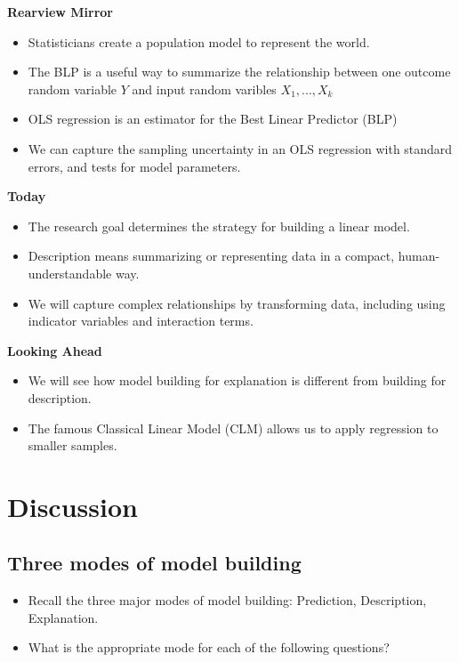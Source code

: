 \documentclass[
]{book}
\providecommand{\tightlist}{%
  \setlength{\itemsep}{0pt}\setlength{\parskip}{0pt}}
\theoremstyle{definition}
\theoremstyle{definition}
\theoremstyle{definition}
\theoremstyle{definition}
\theoremstyle{remark}
\begin{document}
\textbf{Rearview Mirror}

\begin{itemize}
\item
  Statisticians create a population model to represent the world.
\item
  The BLP is a useful way to summarize the relationship between one outcome random variable \(Y\) and input random varibles \(X_1,...,X_k\)
\item
  OLS regression is an estimator for the Best Linear Predictor (BLP)
\item
  We can capture the sampling uncertainty in an OLS regression with standard errors, and tests for model parameters.
\end{itemize}

\textbf{Today}

\begin{itemize}
\item
  The research goal determines the strategy for building a linear model.
\item
  Description means summarizing or representing data in a compact, human-understandable way.
\item
  We will capture complex relationships by transforming data, including using indicator variables and interaction terms.
\end{itemize}

\textbf{Looking Ahead}

\begin{itemize}
\item
  We will see how model building for explanation is different from building for description.
\item
  The famous Classical Linear Model (CLM) allows us to apply regression to smaller samples.
\end{itemize}

\hypertarget{discussion}{%
\section{Discussion}\label{discussion}}

\hypertarget{three-modes-of-model-building}{%
\subsection{Three modes of model building}\label{three-modes-of-model-building}}

\begin{itemize}
\tightlist
\item
  Recall the three major modes of model building: Prediction, Description, Explanation.
\item
  What is the appropriate mode for each of the following questions?
\end{itemize}
\end{document}
